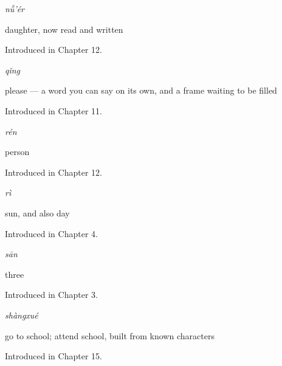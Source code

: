 \noindent\begin{minipage}[t]{\linewidth}
\raggedright
\textbf{}\enspace\emph{nǚ'ér}\par
\small daughter, now read and written\par
\footnotesize Introduced in Chapter 12.
\end{minipage}\par\medskip

\noindent\begin{minipage}[t]{\linewidth}
\raggedright
\textbf{}\enspace\emph{qǐng}\par
\small please — a word you can say on its own, and a frame waiting to be filled\par
\footnotesize Introduced in Chapter 11.
\end{minipage}\par\medskip

\noindent\begin{minipage}[t]{\linewidth}
\raggedright
\textbf{}\enspace\emph{rén}\par
\small person\par
\footnotesize Introduced in Chapter 12.
\end{minipage}\par\medskip

\noindent\begin{minipage}[t]{\linewidth}
\raggedright
\textbf{}\enspace\emph{rì}\par
\small sun, and also day\par
\footnotesize Introduced in Chapter 4.
\end{minipage}\par\medskip

\noindent\begin{minipage}[t]{\linewidth}
\raggedright
\textbf{}\enspace\emph{sān}\par
\small three\par
\footnotesize Introduced in Chapter 3.
\end{minipage}\par\medskip

\noindent\begin{minipage}[t]{\linewidth}
\raggedright
\textbf{}\enspace\emph{shàngxué}\par
\small go to school; attend school, built from known characters\par
\footnotesize Introduced in Chapter 15.
\end{minipage}\par\medskip

